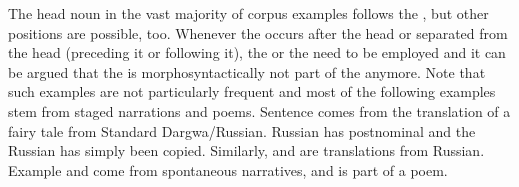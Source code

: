 The head noun in the vast majority of corpus examples follows the , but other positions are possible, too. Whenever the  occurs after the head or separated from the head (preceding it or following it), the  or the  need to be employed and it can be argued that the  is morphosyntactically not part of the  anymore. Note that such examples are not particularly frequent and most of the following examples stem from staged narrations and poems. Sentence  comes from the translation of a fairy tale from Standard Dargwa\slash Russian.  Russian has postnominal  and the Russian  has simply been copied. Similarly,  and  are translations from Russian. Example  and  come from spontaneous narratives, and  is part of a poem.
%
